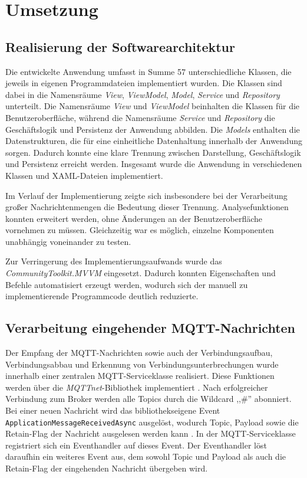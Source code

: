 \chapter{Umsetzung}
\label{cha:Umsetzung}

\section{Realisierung der Softwarearchitektur}
Die entwickelte Anwendung umfasst in Summe 57 unterschiedliche Klassen, die jeweils in eigenen Programmdateien implementiert wurden. Die Klassen sind dabei in die Namensräume \textit{View}, \textit{ViewModel}, \textit{Model}, \textit{Service} und \textit{Repository} unterteilt. Die Namensräume \textit{View} und \textit{ViewModel} beinhalten die Klassen für die Benutzeroberfläche, während die Namensräume \textit{Service} und \textit{Repository} die Geschäftslogik und Persistenz der Anwendung abbilden. Die \textit{Models} enthalten die Datenstrukturen, die für eine einheitliche Datenhaltung innerhalb der Anwendung sorgen. Dadurch konnte eine klare Trennung zwischen Darstellung, Geschäftslogik und Persistenz erreicht werden. Insgesamt wurde die Anwendung in verschiedenen Klassen und XAML-Dateien implementiert.

Im Verlauf der Implementierung zeigte sich insbesondere bei der Verarbeitung großer Nachrichtenmengen die Bedeutung dieser Trennung. Analysefunktionen konnten erweitert werden, ohne Änderungen an der Benutzeroberfläche vornehmen zu müssen. Gleichzeitig war es möglich, einzelne Komponenten unabhängig voneinander zu testen.

Zur Verringerung des Implementierungsaufwands wurde das \textit{CommunityToolkit.MVVM} eingesetzt. Dadurch konnten Eigenschaften und Befehle automatisiert erzeugt werden, wodurch sich der manuell zu implementierende Programmcode deutlich reduzierte. \autocite{sergio0694EinfuehrungMVVMToolkitCommunity}

\section{Verarbeitung eingehender MQTT-Nachrichten}
Der Empfang der MQTT-Nachrichten sowie auch der Verbindungsaufbau, Verbindungsabbau und Erkennung von Verbindungsunterbrechungen wurde innerhalb einer zentralen MQTT-Serviceklasse realisiert. Diese Funktionen werden über die \textit{MQTTnet}-Bibliothek implementiert \autocite{teamHowUseMQTT}. Nach erfolgreicher Verbindung zum Broker werden alle Topics durch die Wildcard ,,\#'' abonniert. Bei einer neuen Nachricht wird das bibliothekseigene Event \lstinline{ApplicationMessageReceivedAsync} ausgelöst, wodurch Topic, Payload sowie die Retain-Flag der Nachricht ausgelesen werden kann \autocite{teamHowUseMQTT}. In der MQTT-Serviceklasse registriert sich ein Eventhandler auf dieses Event. Der Eventhandler löst daraufhin ein weiteres Event aus, dem sowohl Topic und Payload als auch die Retain-Flag der eingehenden Nachricht übergeben wird.

